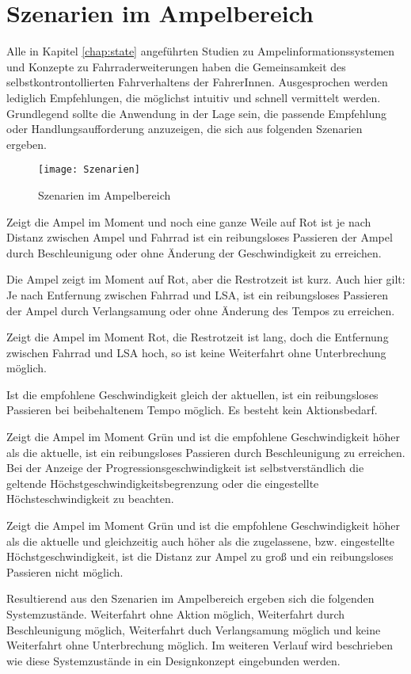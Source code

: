 \chapter{\label{chap:szenarien}Szenarien im Ampelbereich}
Alle in Kapitel \ref{chap:state} angeführten Studien zu Ampelinformationssystemen und Konzepte zu Fahrraderweiterungen haben die Gemeinsamkeit des selbstkontrontollierten Fahrverhaltens der FahrerInnen. Ausgesprochen werden lediglich Empfehlungen, die möglichst intuitiv und schnell vermittelt werden. Grundlegend sollte die Anwendung in der Lage sein, die passende Empfehlung oder Handlungsaufforderung anzuzeigen, die sich aus folgenden Szenarien ergeben.
\begin{figure}[H]  
    \centering  
    \texttt{[image: Szenarien]} 
    \caption[Szenarien]{Szenarien im Ampelbereich}
    \label{fig:szenarien}
\end{figure}
\begin{description}[leftmargin=0.7cm,style=nextline]
\item[Szenario R1:] 
Zeigt die Ampel im Moment und noch eine ganze Weile auf Rot ist je nach Distanz zwischen Ampel und Fahrrad ist ein reibungsloses Passieren der Ampel durch Beschleunigung oder ohne Änderung der Geschwindigkeit zu erreichen.\\
\item[Szenario R2:] 
Die Ampel zeigt im Moment auf Rot, aber die Restrotzeit ist kurz. Auch hier gilt: Je nach Entfernung zwischen Fahrrad und \gls{LSA}, ist ein reibungsloses Passieren der Ampel durch Verlangsamung oder ohne Änderung des Tempos zu erreichen.\\
\item[Szenario R3:] 
Zeigt die Ampel im Moment Rot, die Restrotzeit ist lang, doch die Entfernung zwischen Fahrrad und \gls{LSA} hoch, so ist keine Weiterfahrt ohne Unterbrechung möglich.\\
\item[Szenario G1:] Ist die empfohlene Geschwindigkeit gleich der aktuellen, ist ein reibungsloses Passieren bei beibehaltenem Tempo möglich. Es besteht kein Aktionsbedarf.\\
\item[Szenario G2:] 
Zeigt die Ampel im Moment Grün und ist die empfohlene Geschwindigkeit höher als die aktuelle, ist ein reibungsloses Passieren durch Beschleunigung zu erreichen. Bei der Anzeige der Progressionsgeschwindigkeit ist selbstverständlich die geltende Höchstgeschwindigkeitsbegrenzung oder die eingestellte Höchsteschwindigkeit zu beachten.\\ 
\item[Szenario G3:] 
Zeigt die Ampel im Moment Grün und ist die empfohlene Geschwindigkeit höher als die aktuelle und gleichzeitig auch höher als die zugelassene, bzw. eingestellte Höchstgeschwindigkeit, ist die Distanz zur Ampel zu groß und ein reibungsloses Passieren nicht möglich.
\end{description}
Resultierend aus den Szenarien im Ampelbereich ergeben sich die folgenden Systemzustände.
Weiterfahrt ohne Aktion möglich, Weiterfahrt durch Beschleunigung möglich, Weiterfahrt duch Verlangsamung möglich und keine Weiterfahrt ohne Unterbrechung möglich. Im weiteren Verlauf wird beschrieben wie diese Systemzustände in ein Designkonzept eingebunden werden.
